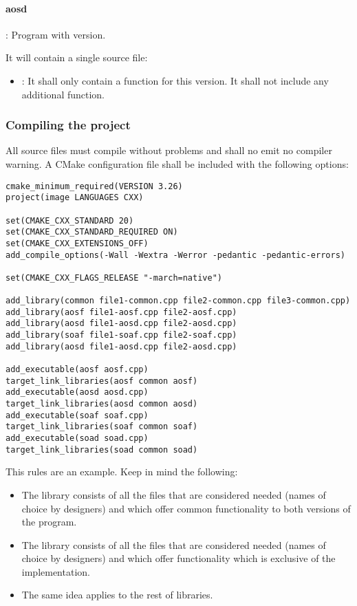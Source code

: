\paragraph{aosd}: Program with  version.

It will contain a single source file:
\begin{itemize}
  \item {}: 
        It shall only contain a  function for this version.
        It shall not include any additional function.
\end{itemize}

\subsubsection{Compiling the project}

All source files must compile without problems and shall no emit no compiler warning.
A CMake configuration file shall be included with the following options:

\begin{lstlisting}[title={CmakeLists.txt},frame=single]
cmake_minimum_required(VERSION 3.26)
project(image LANGUAGES CXX)

set(CMAKE_CXX_STANDARD 20)
set(CMAKE_CXX_STANDARD_REQUIRED ON)
set(CMAKE_CXX_EXTENSIONS_OFF)
add_compile_options(-Wall -Wextra -Werror -pedantic -pedantic-errors)

set(CMAKE_CXX_FLAGS_RELEASE "-march=native")

add_library(common file1-common.cpp file2-common.cpp file3-common.cpp)
add_library(aosf file1-aosf.cpp file2-aosf.cpp)
add_library(aosd file1-aosd.cpp file2-aosd.cpp)
add_library(soaf file1-soaf.cpp file2-soaf.cpp)
add_library(aosd file1-aosd.cpp file2-aosd.cpp)

add_executable(aosf aosf.cpp)
target_link_libraries(aosf common aosf)
add_executable(aosd aosd.cpp)
target_link_libraries(aosd common aosd)
add_executable(soaf soaf.cpp)
target_link_libraries(soaf common soaf)
add_executable(soad soad.cpp)
target_link_libraries(soad common soad)
\end{lstlisting}

This rules are an example. Keep in mind the following:

\begin{itemize}

  \item The library  consists of all the  files
        that are considered needed (names of choice by designers) and
        which offer common functionality to both versions of the program.

  \item The library  consists of all the  files
        that are considered needed (names of choice by designers) and
        which offer functionality which is exclusive of the
         implementation.

  \item The same idea applies to the rest of libraries.

\end{itemize}

